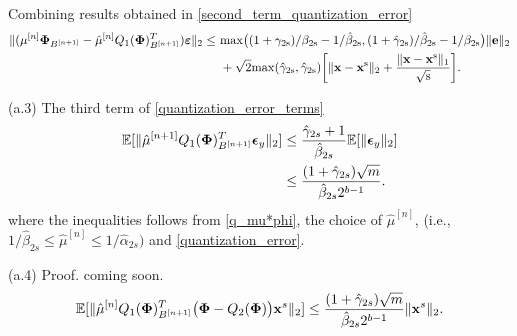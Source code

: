\documentclass{article}
\begin{document}
Combining results obtained in \ref{second_term_quantization_error} 
\begin{equation}\label{second_term_main_theorem}
\begin{split}
    \|(\mu^{[n]}{\bf \Phi}_{B^{[n+1]}} - \hat{\mu}^{[n]}Q_1({\bf \Phi})_{B^{[n+1]}}^T)\boldsymbol{\bf \varepsilon} \|_2 \leq & \ \rm{max}\big((1+\gamma_{2s})/\beta_{2s} - 1/\hat{\beta}_{2s}, (1+\hat{\gamma}_{2s})/\hat{\beta}_{2s} - 1/{\beta}_{2s} \big)\|{\bf e} \|_2\\
    & \ + \sqrt{2}\rm{max}(\hat{\gamma}_{2s}, \hat{\gamma}_{2s})\bigg  [ \|{\bf x}-{\bf x}^s \|_2 + \frac{\|{\bf x}-{\bf x}^s \|_1}{\sqrt{s}}\bigg].
\end{split}
\end{equation}

(a.3) The third term of \ref{quantization_error_terms}
\begin{equation}\label{third_term_main_theorem}
    \begin{split}
         \mathbb{E}[\|\hat{\mu}^{[n+1]}Q_1({\bf \Phi})_{B^{[n+1]}}^T \boldsymbol{\epsilon}_y \|_2] &\leq \frac{\hat{\gamma}_{2s}+1}{\hat{\beta}_{2s}}\mathbb{E}[{\|\boldsymbol{\epsilon}_y \|_2}]\\
         &\leq \frac{(1+\hat{\gamma}_{2s})\sqrt{m}}{\hat{\beta}_{2s}2^{b-1}}.
    \end{split}
\end{equation}
where the inequalities follows from \ref{q_mu*phi}, the choice of $\hat{\mu}^{[n]}$, (i.e., $1/\hat{\beta}_{2s}\leq \hat{\mu}^{[n]} \leq 1/\hat{\alpha}_{2s})$ and \ref{quantization_error}.

(a.4) Proof. coming soon.
\begin{equation}\label{forth_term_main_theorem}
    \mathbb{E}[\| \hat{\mu}^{[n]}Q_1({\bf \Phi})_{B^{[n+1]}}^T\big({\bf {\bf \Phi}}-Q_2({\bf {\bf \Phi}})\big){\bf x}^s \|_2]\leq \frac{(1+\hat{\gamma}_{2s})\sqrt{m}}{\hat{\beta}_{2s}2^{b-1}}\|{\bf x}^s \|_2.
\end{equation}
\end{document}
